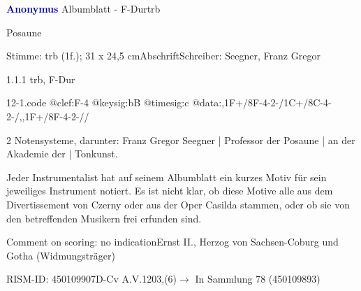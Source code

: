 \documentclass[a4paper, twocolumn, 11pt]{book}
\begin{document}
\par \vspace{16pt} \textcolor{darkblue}{\textbf{Anonymus  }}\hfillplus{[12]}\newline Albumblatt - F-Dur\newline trb
\par \begin{itshape}[heading:] Posaune\end{itshape} 
\par \textcolor{darkblue}{}  Stimme: trb  (1f.); 31 x 24,5 cm\newline Abschrift\newline Schreiber: Seegner, Franz Gregor
\par 1.1.1  trb, F-Dur  
\begin{filecontents*}{12-1.code}
@clef:F-4
@keysig:bB
@timesig:c
@data:,1F+/8F-4-2-/1C+/8C-4-2-/,,1F+/8F-4-2-//
\end{filecontents*}
\newline %
\par 2 Notensysteme, darunter: Franz Gregor Seegner | Professor der Posaune | an der Akademie der | Tonkunst.
\par Jeder Instrumentalist hat auf seinem Albumblatt ein kurzes Motiv für sein jeweiliges Instrument notiert. Es ist nicht klar, ob diese Motive alle aus dem {\textquotedbl}Divertissement{\textquotedbl} von Czerny oder aus der Oper {\textquotedbl}Casilda{\textquotedbl} stammen, oder ob sie von den betreffenden Musikern frei erfunden sind.
\par Comment on scoring: no indication\newline Ernst II., Herzog von Sachsen-Coburg und Gotha  (Widmungsträger)
\par RISM-ID: 450109907\newline D-Cv  A.V.1203,(6)\newline $\rightarrow$ In Sammlung 78 (450109893)
      
\end{document}
